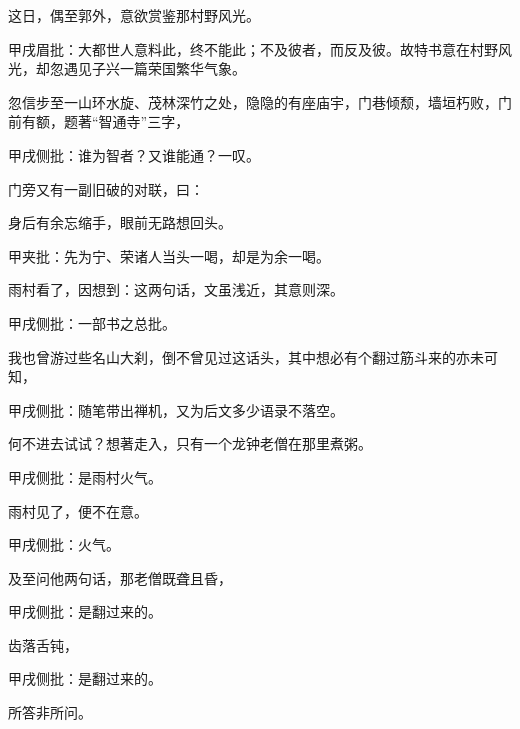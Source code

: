 \begin{parag}
    这日，偶至郭外，意欲赏鉴那村野风光。\begin{note}甲戌眉批：大都世人意料此，终不能此；不及彼者，而反及彼。故特书意在村野风光，却忽遇见子兴一篇荣国繁华气象。\end{note}忽信步至一山环水旋、茂林深竹之处，隐隐的有座庙宇，门巷倾颓，墙垣朽败，门前有额，题著“智通寺”三字，\begin{note}甲戌侧批：谁为智者？又谁能通？一叹。\end{note}门旁又有一副旧破的对联，曰：
\end{parag}


\begin{poem}
    \begin{pl}
        身后有余忘缩手，眼前无路想回头。\end{pl}\begin{note}甲夹批：先为宁、荣诸人当头一喝，却是为余一喝。\end{note}
\end{poem}

\begin{parag}
    雨村看了，因想到：这两句话，文虽浅近，其意则深。\begin{note}甲戌侧批：一部书之总批。\end{note}我也曾游过些名山大刹，倒不曾见过这话头，其中想必有个翻过筋斗来的亦未可知，\begin{note}甲戌侧批：随笔带出禅机，又为后文多少语录不落空。\end{note}何不进去试试？想著走入，只有一个龙钟老僧在那里煮粥。\begin{note}甲戌侧批：是雨村火气。\end{note}雨村见了，便不在意。\begin{note}甲戌侧批：火气。\end{note}及至问他两句话，那老僧既聋且昏，\begin{note}甲戌侧批：是翻过来的。\end{note}齿落舌钝，\begin{note}甲戌侧批：是翻过来的。\end{note}所答非所问。
\end{parag}


